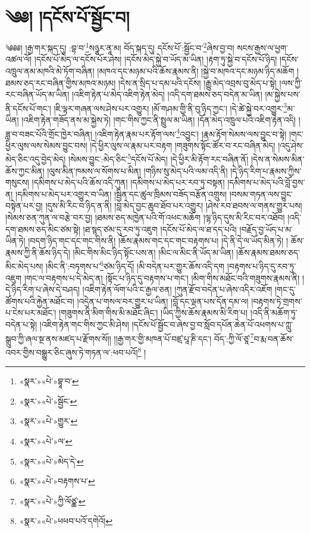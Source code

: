 \chapter{༄༅། །དངོས་པོ་སྦྱོང་བ།}༄༅༅། །རྒྱ་གར་སྐད་དུ། :བྷ་བ་\footnote{«སྣར་»«པེ་»བྷཱ་བ་}སཉྩར་ནཱ་མ། བོད་སྐད་དུ། དངོས་པོ་:སྦྱོང་བ་\footnote{«སྣར་»«པེ་»སྦྱོང་}ཞེས་བྱ་བ། སངས་རྒྱས་ལ་ཕྱག་འཚལ་ལོ། །དངོས་པོ་མེད་ལ་དངོས་པོར་ཤེས། །དངོས་མེད་སྐྱེ་བ་ཡོད་མ་ཡིན། །རྟག་ཏུ་སྐྱེ་བ་དངོས་པོ་ཉིད། །དངོས་འཁྲུལ་ནམ་མཁའི་མེ་ཏོག་བཞིན། །མཁའ་དང་མཉམ་པའི་ཆོས་རྣམས་ནི། །སྐྱེ་བ་མཁའ་དང་མཉམ་ཉིད་མཆོག །ཐམས་ཅད་རང་བཞིན་གྱིས་མཁའ་མཉམ། །དེས་ན་སྲིད་པ་དམ་པའི་དངོས། །རྒྱུ་མེད་འབྲས་བུ་མེད་པ་སྟེ། །ལས་ཀྱི་རང་བཞིན་ཡོད་མ་ཡིན། །འཇིག་རྟེན་པ་མེད་འཇིག་རྟེན་མེད། །འདི་དག་ཐམས་ཅད་བདེན་མ་ཡིན། །མ་སྐྱེས་པས་ནི་དངོས་པོ་གང་། །ཇི་ལྟར་གཞན་ལས་ཤེས་པར་འགྱུར། །མོ་གཤམ་གྱི་ནི་བུ་ཉིད་ཀྱང་། །དེ་ཚེ་སྐྱེ་བར་འགྱུར་\footnote{«སྣར་»«པེ་»གྱུར་}མ་ཡིན། །འཇིག་རྟེན་གཟོད་ནས་མ་སྐྱེས་ཏེ། །གང་གིས་ཀྱང་ནི་སྤྲུལ་མ་ཡིན། །དོན་མེད་འཁྲུལ་པའི་འཇིག་རྟེན་འདི། །ཟླ་བ་བཟང་པོའི་གྲོང་ཁྱེར་བཞིན། །འཇིག་རྟེན་རྣམ་པར་རྟོག་ལས་\footnote{«སྣར་»«པེ་»ལ་}འབྱུང་། །རྣམ་རྟོག་སེམས་ལས་བྱུང་བ་སྟེ། །གང་ཕྱིར་ལུས་ལས་སེམས་བྱུང་བས། །དེ་ཕྱིར་ལུས་ལ་རྣམ་པར་བརྟག །གཟུགས་སྟོང་ཚོར་བ་རང་བཞིན་མེད། །འདུ་ཤེས་མེད་ཅིང་འདུ་བྱེད་མེད། །སེམས་བྱུང་:མེད་ཅིང་\footnote{«སྣར་»«པེ་»མེད་དེ་}དངོས་པོ་མེད། །དེ་ཕྱིར་མི་རྟོག་རང་བཞིན་ནོ། །དེས་ན་སེམས་མིན་ཆོས་ཀྱང་མིན། །ལུས་མིན་ཁམས་ལ་སོགས་པ་མིན། །གཉིས་སུ་མེད་པའི་ལམ་འདི་ནི། །དེ་ཉིད་རིག་པ་རྣམས་ཀྱིས་གསུངས། །དམིགས་པ་མེད་པའི་ཆོས་འདི་ཀུན། །དམིགས་པ་མེད་པར་རབ་ཏུ་བསྟན། །དམིགས་པ་མེད་པའི་བློ་བྱས་ན། །དམིགས་པ་མེད་པར་འགྱུར་བ་ཡིན། །སྦྱིན་དང་ཚུལ་ཁྲིམས་བཟོད་བརྩོན་འགྲུས། །བསམ་གཏན་ལས་བྱུང་བསྟེན་པར་བྱ། །དུས་མི་རིང་བ་ཉིད་ན་ནི། །བླ་མེད་བྱང་ཆུབ་ཐོབ་པར་འགྱུར། །ཤེས་རབ་ཐབས་ལ་གནས་གྱུར་པས། །སེམས་ཅན་ཀུན་ལ་བརྩེ་བར་བྱ། །ཐམས་ཅད་མཁྱེན་པའི་གོ་འཕང་མཆོག །ལྷ་ཉིད་དུས་མི་རིང་བར་འཐོབ། །འདི་དག་ཐམས་ཅད་མིང་ཙམ་སྟེ། །ཐ་སྙད་ཙམ་དུ་རབ་ཏུ་འཇུག །དངོས་པོ་མེད་ལ་ཐ་དད་པའི། །བརྗོད་བྱ་ཡོད་པ་མ་ཡིན་ཏེ། །བདག་ཉིད་གང་དང་གང་གིས་ནི། །ཆོས་རྣམས་གང་དང་གང་བརྟགས་པ། །དེ་ནི་དེ་ལ་ཡོད་མིན་ཏེ། །
ཆོས་རྣམས་ཀྱི་ནི་ཆོས་ཉིད་དེ། །མིང་གིས་མིང་ཉིད་སྟོང་པས་ན། །མིང་ལ་མིང་ནི་ཡོད་མ་ཡིན། །ཆོས་རྣམས་ཐམས་ཅད་མིང་མེད་པས། །མིང་ནི་:བཏགས་པ་\footnote{«སྣར་»«པེ་»བརྟགས་པ་}ཙམ་ཉིད་དོ། །མི་བདེན་པར་གྱུར་ཆོས་འདི་དག །བརྟགས་པ་ཉིད་དུ་རབ་ཏུ་འཇུག །གང་ལ་བརྟགས་པ་དེ་མེད་ན། །སྟོང་པ་ཉིད་དུ་བརྟགས་པ་གང་། །མིག་གིས་མཐོང་བའི་གཟུགས་རྣམས་ནི། །དེ་ཉིད་རིག་པ་ཞེས་དེ་བཤད། །འཇིག་རྟེན་ལོག་པའི་ང་རྒྱལ་ཅན། །ཀུན་རྫོབ་བདེན་པ་ཞེས་འདིར་འཇོག །གང་དུ་ཚོགས་པའི་རྐྱེན་མཐོང་བ། །འདྲེན་པ་གསལ་བར་གྱུར་པ་ཡིན། །བློ་དང་ལྡན་པས་དོན་དམ་ལ། །བརྟགས་ཏེ་གྲགས་པ་ངེས་པར་མཐོང་། །གཟུགས་ནི་མིག་གིས་མི་མཐོང་ཞིང་། །ཡིད་ཀྱིས་ཆོས་རྣམས་མི་རིག་པ། །འདི་ནི་མཆོག་ཏུ་བདེན་པ་སྟེ། །འཇིག་རྟེན་གང་གིས་ཀྱང་མི་ཤེས། །དངོས་པོ་སྦྱོང་བ་ཞེས་བྱ་བ་སློབ་དཔོན་ཆེན་པོ་འཕགས་པ་ཀླུ་སྒྲུབ་ཀྱི་ཞལ་སྔ་ནས་མཛད་པ་རྫོགས་སོ།། །།རྒྱ་གར་གྱི་མཁན་པོ་བཛྲ་པཱ་ཎི་དང་། བོད་:ཀྱི་ལོ་ཙཱ་\footnote{«སྣར་»«པེ་»ཀྱི་ལོཙྪ་}བ་རྨ་བན་ཆོས་འབར་གྱིས་བསྒྱུར་ཅིང་ཞུས་ཏེ་གཏན་ལ་:ཕབ་པའོ།\footnote{«སྣར་»«པེ་»ཕཕབ་པའོ་དགེའོ།} ། 